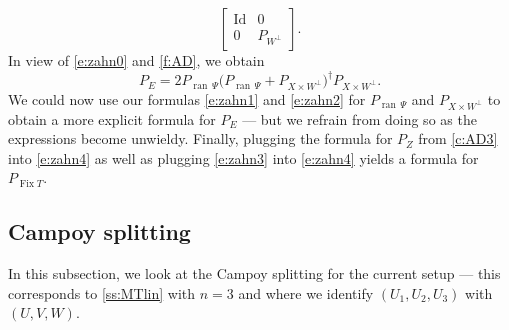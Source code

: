 \documentclass[11pt]{article}
\newcommand{\ran}{\ensuremath{{\operatorname{ran}}\,}}
\newcommand{\Fix}{\ensuremath{\operatorname{Fix}}}
\newcommand{\Id}{\ensuremath{\operatorname{Id}}}
\theoremstyle{definition}
\providecommand{\ran}{\operatorname{ran}}
\providecommand{\Id}{\operatorname{{ Id}}}
\providecommand{\ran}{\operatorname{ran}}
\providecommand{\Id}{\operatorname{Id}}
\begin{document}
{\begin{equation}
\begin{bmatrix}
\Id & 0 \\
0 & P_{W^\perp}
\end{bmatrix}. 
\end{equation}
In view of \cref{e:zahn0}
and \cref{f:AD}, we obtain
\begin{equation}
\label{e:zahn3}
P_E = 2P_{\ran\Psi}\big( P_{\ran\Psi}+P_{X\times W^\perp}\big)^\dagger
P_{X\times W^\perp}.
\end{equation}
We could 
now use our formulas \cref{e:zahn1} and \cref{e:zahn2}
for $P_{\ran\Psi}$ and $P_{X\times W^\perp}$
to obtain a more explicit formula for $P_E$ --- 
but we refrain from doing so as the expressions become unwieldy.
Finally, plugging the formula for $P_Z$ from \cref{c:AD3} 
into \cref{e:zahn4} as well as plugging \cref{e:zahn3} into \cref{e:zahn4} 
yields a formula for $P_{\Fix T}$. 


\subsection{Campoy splitting}


In this subsection, we look at the Campoy splitting for the current setup
--- this corresponds to \cref{ss:MTlin} with $n=3$ and where
we identify $(U_1,U_2,U_3)$ with $(U,V,W)$.

}
\end{document}
